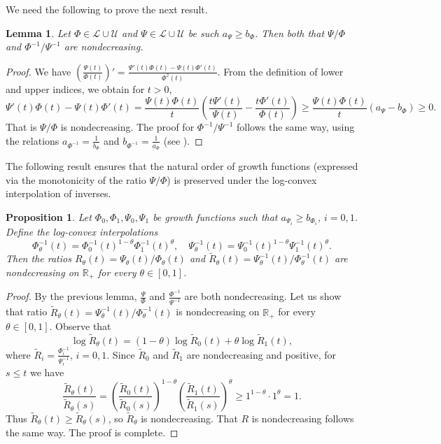 \documentclass[12pt]{amsart}
\newtheorem{proposition}{Proposition}
\newtheorem{lemma}{Lemma}
\newcommand{\U}{\mathcal{U}}
\newcommand{\Lc}{\mathcal{L}}
\newcommand{\R}{\mathbb{R}}
\begin{document}
We need the following to prove the next result.
\begin{lemma}\label{lem:inversemonocity}
Let $\Phi\in\Lc\cup\U$ and $\Psi\in\Lc\cup\U$ be such $a_\Psi\ge b_\Phi$. Then both that ${\Psi}/{\Phi}$ and ${\Phi^{-1}}/{\Psi^{-1}}$ are nondecreasing.
\end{lemma}
\begin{proof}
We have $\left(\frac{\Psi(t)}{\Phi(t)}\right)'=\frac{\Psi'(t)\Phi(t)-\Psi(t)\Phi'(t)}{\Phi^2(t)}$. From the definition of lower and upper indices, we obtain for $t>0$,
$$\Psi'(t)\Phi(t)-\Psi(t)\Phi'(t)=\frac{\Psi(t)\Phi(t)}{t}\left(\frac{t\Psi'(t)}{\Psi(t)}-\frac{t\Phi'(t)}{\Phi(t)}\right)\ge \frac{\Psi(t)\Phi(t)}{t}(a_{\Psi}-b_{\Phi})\ge 0.$$
That is ${\Psi}/{\Phi}$ is nondecreasing. The proof for ${\Phi^{-1}}/{\Psi^{-1}}$ follows the same way, using the relations $a_{\Phi^{-1}}=\frac{1}{b_\Phi}$ and $b_{\Phi^{-1}}=\frac{1}{a_\Phi}$ (see \cite{DieSehba2023}).  
\end{proof}
The following result ensures that the natural order of growth functions (expressed via the monotonicity of the ratio $\Psi/\Phi$) is preserved under the log-convex interpolation of inverses. 

\begin{proposition}\label{prop:monotonicity-preservation}
Let $\Phi_0,\Phi_1,\Psi_0,\Psi_1$ be growth functions such that $a_{\Psi_i}\ge b_{\Phi_i}$, $i=0,1$.
Define the log-convex interpolations
\[
\Phi_\theta^{-1}(t) = \Phi_0^{-1}(t)^{1-\theta} \Phi_1^{-1}(t)^{\theta}, \quad
\Psi_\theta^{-1}(t) = \Psi_0^{-1}(t)^{1-\theta} \Psi_1^{-1}(t)^{\theta}.
\]
Then the ratios $R_\theta(t) = \Psi_\theta(t)/\Phi_\theta(t)$ and $\tilde{R}_\theta(t) = \Psi_\theta^{-1}(t)/\Phi_\theta^{-1}(t)$ are  nondecreasing on $\R_+$ for every $\theta \in [0,1]$.
\end{proposition}

\begin{proof}
By the previous lemma, $\frac{\Psi}{\Phi}$ and $\frac{\Phi^{-1}}{\Psi^{-1}}$ are both nondecreasing. Let us show that ratio $\tilde{R}_\theta(t) = \Psi_\theta^{-1}(t)/\Phi_\theta^{-1}(t)$ is nondecreasing on $\R_+$ for every $\theta \in [0,1]$.
Observe that
\[
\log \tilde{R}_\theta(t) = (1-\theta)\log \tilde{R}_0(t) + \theta \log \tilde{R}_1(t),
\]
where $\tilde{R}_i=\frac{\Phi_i^{-1}}{\Psi_i^{-1}}$, $i=0,1$. Since $\tilde{R}_0$ and $\tilde{R}_1$ are nondecreasing and positive, for $s \le t$ we have
\[
\frac{\tilde{R}_\theta(t)}{\tilde{R}_\theta(s)} = \left(\frac{\tilde{R}_0(t)}{\tilde{R}_0(s)}\right)^{1-\theta}
\left(\frac{\tilde{R}_1(t)}{\tilde{R}_1(s)}\right)^{\theta} \ge 1^{1-\theta} \cdot 1^{\theta} = 1.
\]
Thus $\tilde{R}_\theta(t) \ge \tilde{R}_\theta(s)$, so $\tilde{R}_\theta$ is nondecreasing. That $R$ is nondecreasing follows the same way. The proof is complete.
\end{proof}
\end{document}
